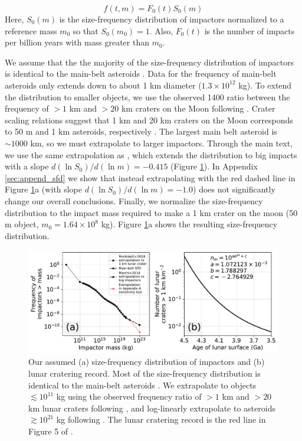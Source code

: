 \documentclass[manuscript]{aastex63}
\begin{document}
\begin{equation}
  f(t,m) = F_0(t) S_0(m)
\end{equation}
Here, $S_0(m)$ is the size-frequency distribution of impactors normalized to a reference mass $m_0$ so that $S_0(m_0) = 1$. Also, $F_0(t)$ is the number of impacts per billion years with mass greater than $m_0$.

We assume that the the majority of the size-frequency distribution of impactors is identical to the main-belt asteroids \citep[Extended Data Figure 1 in][]{Marchi_2014}. Data for the frequency of main-belt asteroids only extends down to about 1 km diameter ($1.3 \times 10^{12} $ kg). To extend the distribution to smaller objects, we use the observed 1400 ratio between the frequency of $> 1$ km and $> 20$ km craters on the Moon following \citet{Morbidelli_2018}. Crater scaling relations suggest that 1 km and 20 km craters on the Moon corresponds to 50 m and 1 km asteroids, respectively \citep{Morbidelli_2018}. The largest main belt asteroid is $\sim 1000$ km, so we must extrapolate to larger impactors. Through the main text, we use the same extrapolation as \citet{Marchi_2014}, which extends the distribution to big impacts with a slope $d (\ln S_0)/d (\ln m) = - 0.415$ (Figure \ref{fig:sfd_and_flux}). In Appendix \ref{sec:append_sfd} we show that instead extrapolating with the red dashed line in Figure \ref{fig:sfd_and_flux}a (with slope $d (\ln S_0)/d (\ln m) = - 1.0$) does not significantly change our overall conclusions. Finally, we normalize the size-frequency distribution to the impact mass required to make a 1 km crater on the moon (50 m object, $m_0 = 1.64 \times 10^{8}$ kg). Figure \ref{fig:sfd_and_flux}a shows the resulting size-frequency distribution.

\begin{figure}
  \centering
  \includegraphics[width=1.0\textwidth]{figures/SFD_and_flux.pdf}
  \caption{Our assumed (a) size-frequency distribution of impactors and (b) lunar cratering record. Most of the size-frequency distribution is identical to the main-belt asteroids \citep[Extended Data Figure 1 in][]{Marchi_2014}. We extrapolate to objects $\lesssim 10^{11}$ kg using the observed frequency ratio of $> 1$ km and $> 20$ km lunar craters following \citet{Morbidelli_2018}, and log-linearly extrapolate to asteroids $\gtrsim 10^{21}$ kg following \citet{Marchi_2014}. The lunar cratering record is the red line in Figure 5 of \citet{Morbidelli_2018}.}
  \label{fig:sfd_and_flux}
\end{figure}
\end{document}
